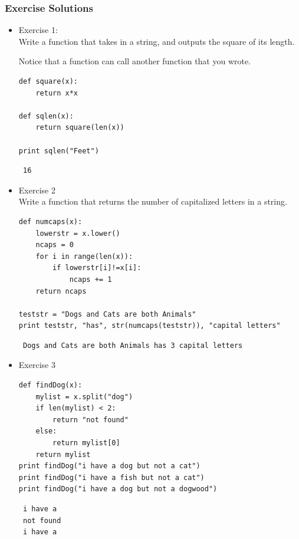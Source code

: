 \documentclass[11pt]{article}
\begin{document}
\subsubsection{Exercise Solutions}
\label{sec-2-6-1}
\begin{itemize}

\item Exercise 1:\\
\label{sec-2-6-1-1}%
Write a function that takes in a string, and outputs the square of its
length.

Notice that a function can call another function that you wrote.

\begin{verbatim}
def square(x):
    return x*x

def sqlen(x):
    return square(len(x))

print sqlen("Feet")
\end{verbatim}

\begin{verbatim}
 16
\end{verbatim}


\item Exercise 2\\
\label{sec-2-6-1-2}%
Write a function that returns the number of capitalized letters in a
string.


\begin{verbatim}
def numcaps(x):
    lowerstr = x.lower()
    ncaps = 0
    for i in range(len(x)):
        if lowerstr[i]!=x[i]:
            ncaps += 1
    return ncaps

teststr = "Dogs and Cats are both Animals"
print teststr, "has", str(numcaps(teststr)), "capital letters"
\end{verbatim}

\begin{verbatim}
 Dogs and Cats are both Animals has 3 capital letters
\end{verbatim}


\item Exercise 3\\
\label{sec-2-6-1-3}%
\begin{verbatim}
def findDog(x):
    mylist = x.split("dog")
    if len(mylist) < 2:
        return "not found"
    else:
        return mylist[0]    
    return mylist
print findDog("i have a dog but not a cat")
print findDog("i have a fish but not a cat")
print findDog("i have a dog but not a dogwood")
\end{verbatim}

\begin{verbatim}
 i have a 
 not found
 i have a 
\end{verbatim}

\end{itemize} %
\end{document}
